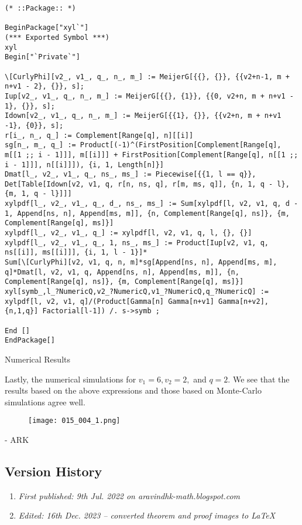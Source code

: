 \begin{verbatim}
(* ::Package:: *)

BeginPackage["xyl`"]
(*** Exported Symbol ***)
xyl
Begin["`Private`"]

\[CurlyPhi][v2_, v1_, q_, n_, m_] := MeijerG[{{}, {}}, {{v2+n-1, m + n+v1 - 2}, {}}, s]; 
Iup[v2_, v1_, q_, n_, m_] := MeijerG[{{}, {1}}, {{0, v2+n, m + n+v1 - 1}, {}}, s]; 
Idown[v2_, v1_, q_, n_, m_] := MeijerG[{{1}, {}}, {{v2+n, m + n+v1 -1}, {0}}, s]; 
r[i_, n_, q_] := Complement[Range[q], n][[i]]
sg[n_, m_, q_] := Product[(-1)^(FirstPosition[Complement[Range[q], m[[1 ;; i - 1]]], m[[i]]] + FirstPosition[Complement[Range[q], n[[1 ;; i - 1]]], n[[i]]]), {i, 1, Length[n]}]
Dmat[l_, v2_, v1_, q_, ns_, ms_] := Piecewise[{{1, l == q}}, Det[Table[Idown[v2, v1, q, r[n, ns, q], r[m, ms, q]], {n, 1, q - l}, {m, 1, q - l}]]]
xylpdf[l_, v2_, v1_, q_, d_, ns_, ms_] := Sum[xylpdf[l, v2, v1, q, d - 1, Append[ns, n], Append[ms, m]], {n, Complement[Range[q], ns]}, {m, Complement[Range[q], ms]}]
xylpdf[l_, v2_, v1_, q_] := xylpdf[l, v2, v1, q, l, {}, {}]
xylpdf[l_, v2_, v1_, q_, 1, ns_, ms_] := Product[Iup[v2, v1, q, ns[[i]], ms[[i]]], {i, 1, l - 1}]*
Sum[\[CurlyPhi][v2, v1, q, n, m]*sg[Append[ns, n], Append[ms, m], q]*Dmat[l, v2, v1, q, Append[ns, n], Append[ms, m]], {n, Complement[Range[q], ns]}, {m, Complement[Range[q], ms]}]
xyl[symb_,l_?NumericQ,v2_?NumericQ,v1_?NumericQ,q_?NumericQ] := xylpdf[l, v2, v1, q]/(Product[Gamma[n] Gamma[n+v1] Gamma[n+v2],{n,1,q}] Factorial[l-1]) /. s->symb ;

End []
EndPackage[]
\end{verbatim}

Numerical Results

Lastly, the numerical simulations for $v_1 = 6, v_2 = 2,$ and $q = 2.$ We see that the results based on the above expressions and those based on Monte-Carlo simulations agree well.

\begin{figure}[H]
	\centering
	\texttt{[image: 015\_004\_1.png]}
\end{figure}

- ARK

\subsection{Version History}
\begin{enumerate}
	\item \emph{First published: 9th Jul. 2022 on aravindhk-math.blogspot.com}
	\item \emph{Edited: 16th Dec. 2023 -- converted theorem and proof images to \LaTeX}
\end{enumerate}


